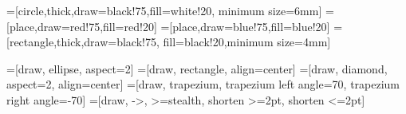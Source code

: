 \usepackage{ifthen}
\usepackage{amsmath}
\usepackage[usenames,dvipsnames]{color}
\usepackage{listings}
\usepackage{graphicx}

\newcommand{\bfc}{{\sc Bfc}}
\newcommand{\mist}{{\sc Mist}}
\newcommand{\iic}{{\sc IIC}}
\newcommand{\pnerf}{{\sc Pnerf}}
\newcommand{\zthree}{{\sc Z3}}

\newcommand{\safety}{{\bf Safety}}
\newcommand{\safetyref}{{\bf Safety by Refinement}}

\newcommand{\ttt}[1]{\texttt{#1}}

\usepackage{tikz}
\usetikzlibrary{arrows,shapes,shapes.multipart,shapes.geometric,
	snakes,automata,backgrounds,petri,calc,positioning}


=[circle,thick,draw=black!75,fill=white!20,
  	minimum size=6mm]
=[place,draw=red!75,fill=red!20]
=[place,draw=blue!75,fill=blue!20]
=[rectangle,thick,draw=black!75,
  	fill=black!20,minimum size=4mm]

=[draw, ellipse, aspect=2]
=[draw, rectangle, align=center]
=[draw, diamond, aspect=2, align=center]
=[draw, trapezium, trapezium left angle=70, trapezium right angle=-70]
=[draw, ->, >=stealth, shorten >=2pt, shorten <=2pt]